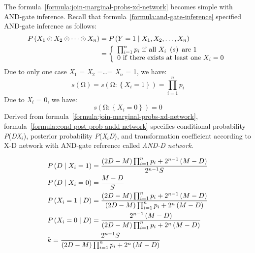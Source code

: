 \documentclass{article}
\numberwithin{equation}{section}
\numberwithin{figure}{section}
\numberwithin{table}{section}
\begin{document}
The formula~\ref{formula:join-marginal-probs-xd-network} becomes simple with AND-gate inference. Recall that formula~\ref{formula:and-gate-inference} specified AND-gate inference as follows:
\begin{align*}
P\left(X_1\odot X_2\odot \dots \odot X_n\right)&=P\left(Y=1\mathrel{\left|\vphantom{Y=1 X_1,X_2,\dots ,X_n}\right.\kern-\nulldelimiterspace}X_1,X_2,\dots ,X_n\right)\\
&=\left\{ \begin{array}{l}
\prod^n_{i=1}{p_i}\ \mathrm{if\ all}\ X_i\ \left(s\right)\ \mathrm{are}\ 1 \\ 
0\ \mathrm{if\ there\ exists\ at\ least\ one\ }X_i=0 \end{array}
\right.
\end{align*}
Due to only one case \textit{X}${}_{1}$ = \textit{X}${}_{2}$ ={\dots}= \textit{X${}_{n}$} = 1, we have:
\[s\left(\mathrm{\Omega }\right)=s\left(\mathrm{\Omega }\mathrm{:}\left\{X_i=1\right\}\right)=\prod^n_{i=1}{p_i}\] 
Due to \textit{X${}_{i}$} = 0, we have:
\[s\left(\mathrm{\Omega }\mathrm{:}\left\{X_i=0\right\}\right)=0\] 
Derived from formula~\ref{formula:join-marginal-probs-xd-network}, formula~\ref{formula:cond-post-prob-andd-network} specifies conditional probability \textit{P}(\textit{D{\textbar}X${}_{i}$}), posterior probability \textit{P}(\textit{X${}_{i}${\textbar}D}), and transformation coefficient according to X-D network with AND-gate reference called \textit{AND-D network}.

\begin{equation}
\begin{split}
&P\left(D\mathrel{\left|\vphantom{D X_i=1}\right.\kern-\nulldelimiterspace}X_i=1\right)=\frac{\left(2D-M\right)\prod^n_{i=1}{p_i}+2^{n-1}\left(M-D\right)}{2^{n-1}S}\\
&P\left(D\mathrel{\left|\vphantom{D X_i=0}\right.\kern-\nulldelimiterspace}X_i=0\right)=\frac{M-D}{S}\\
&P\left(X_i=1\mathrel{\left|\vphantom{X_i=1 D}\right.\kern-\nulldelimiterspace}D\right)=\frac{\left(2D-M\right)\prod^n_{i=1}{p_i}+2^{n-1}\left(M-D\right)}{\left(2D-M\right)\prod^n_{i=1}{p_i}+2^n\left(M-D\right)}\\
&P\left(X_i=0\mathrel{\left|\vphantom{X_i=0 D}\right.\kern-\nulldelimiterspace}D\right)=\frac{2^{n-1}\left(M-D\right)}{\left(2D-M\right)\prod^n_{i=1}{p_i}+2^n\left(M-D\right)}\\
&k=\frac{2^{n-1}S}{\left(2D-M\right)\prod^n_{i=1}{p_i}+2^n\left(M-D\right)}
\end{split}
\label{formula:cond-post-prob-andd-network}
\end{equation}
\end{document}
